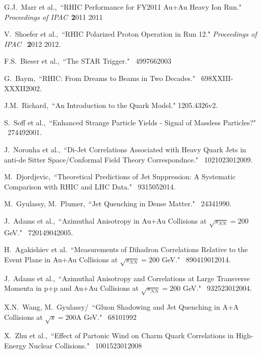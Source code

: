 \begin{thebibliography}{1000}
G.J.~Marr et al.,~``RHIC Performance for FY2011 Au+Au Heavy Ion Run." \textit {Proceedings of IPAC}~{\textbf 2011} {2011}

V.~Shoefer et al.,~``RHIC Polarized Proton Operation in Run 12." \textit {Proceedings of IPAC}
~{\textbf 2012} {2012}.

F.S.~Bieser et al.,~``The STAR Trigger." \Journal{\NIM} {~499}{766}{2003}


G.~Baym,~``RHIC: From Dreams to Beams in Two Decades." \Journal{\NPA} {~698}{XXIII-XXXII}{2002}.

J.M.~Richard,~``An Introduction to the Quark Model." \arXiv1205.4326v2.


S.~Soff et al.,~``Enhanced Strange Particle Yields - Signal of Massless Particles?" \Journal{\JPG} {~27}{449}{2001}.

J.~Noronha et al.,~``Di-Jet Correlations Associated with Heavy Quark Jets in anti-de Sitter Space/Conformal Field Theory Correspondnce." \Journal{\PRL} {~102}{102301}{2009}.

M.~Djordjevic,~``Theoretical Predictions of Jet Suppression: A Systematic Comparison with RHIC and LHC Data." \Journal{\NPA} {~931}{505}{2014}.

M.~Gyulassy, M.~Plumer,~``Jet Quenching in Dense Matter." \Journal{\PLB} {~243}{4}{1990}.

J.~Adams et al.,~``Azimuthal Anisotropy in Au+Au Collisions at $\sqrt{s_{NN}} = 200$ GeV." \Journal{\PRC} {~72}{014904}{2005}.

H.~Agakishiev et al.~``Measurements of Dihadron Correlations Relative to the Event Plane in Au+Au Collisions at $\sqrt{s_{NN}} = 200$ GeV." \Journal{\PRC} {~89}{041901}{2014}.

J.~Adams et al.,~``Azimuthal Anisotropy and Correlations at Large Transverse Momenta in p+p and Au+Au Collisions at $\sqrt{s_{NN}} = 200$ GeV." \Journal{\PRL} {~93}{252301}{2004}.

X.N.~Wang, M.~Gyulassy/~``Gluon Shadowing and Jet Quenching in A+A Collisions at $\sqrt{s} = 200$A GeV." \Journal{\PRL} {~68}{10}{1992}

X.~Zhu et al.,~``Effect of Partonic Wind on Charm Quark Correlations in High-Energy Nuclear Collisions." \Journal{\PRL} {~100}{152301}{2008}


\end{thebibliography}
